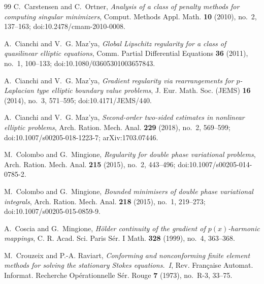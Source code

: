 \documentclass[11pt]{amsart}
\theoremstyle{definition}
\theoremstyle{remark}
\numberwithin{equation}{section}
\begin{document}
\begin{thebibliography}{99}
C.~Carstensen and C.~Ortner, \emph{Analysis of a class of penalty methods for computing singular minimizers}, Comput. Methods Appl. Math. \textbf{10} (2010), no.~2, 137--163; doi:10.2478/cmam-2010-0008.

A.~Cianchi and V.~G. Maz'ya, \emph{Global Lipschitz regularity for a class of quasilinear elliptic equations}, Comm. Partial Differential Equations \textbf{36} (2011), no.~1, 100--133; doi:10.1080/03605301003657843.

A.~Cianchi and V.~G. Maz'ya, \emph{Gradient regularity via rearrangements for $p$-Laplacian type elliptic boundary value problems}, J. Eur. Math. Soc. (JEMS) \textbf{16} (2014), no.~3, 571--595; doi:10.4171/JEMS/440.

A.~Cianchi and V.~G. Maz'ya, \emph{Second-order two-sided estimates in nonlinear elliptic problems}, Arch. Ration. Mech. Anal. \textbf{229} (2018), no.~2, 569--599; doi:10.1007/s00205-018-1223-7; arXiv:1703.07446.

M.~Colombo and G.~Mingione, \emph{Regularity for double phase variational problems}, Arch. Ration. Mech. Anal. \textbf{215} (2015), no.~2, 443--496; doi:10.1007/s00205-014-0785-2.

M.~Colombo and G.~Mingione, \emph{Bounded minimisers of double phase variational integrals}, Arch. Ration. Mech. Anal. \textbf{218} (2015), no.~1, 219--273; doi:10.1007/s00205-015-0859-9.

A.~Coscia and G.~Mingione, \emph{H\"older continuity of the gradient of $p(x)$-harmonic mappings}, C. R. Acad. Sci. Paris S\'er. I Math. \textbf{328} (1999), no.~4, 363--368.

M.~Crouzeix and P.-A. Raviart, \emph{Conforming and nonconforming finite element methods for solving the stationary Stokes equations.~I}, Rev. Fran\c{c}aise Automat. Informat. Recherche Op\'erationnelle S\'er. Rouge \textbf{7} (1973), no.~R-3, 33--75.


\end{thebibliography}
\end{document}
